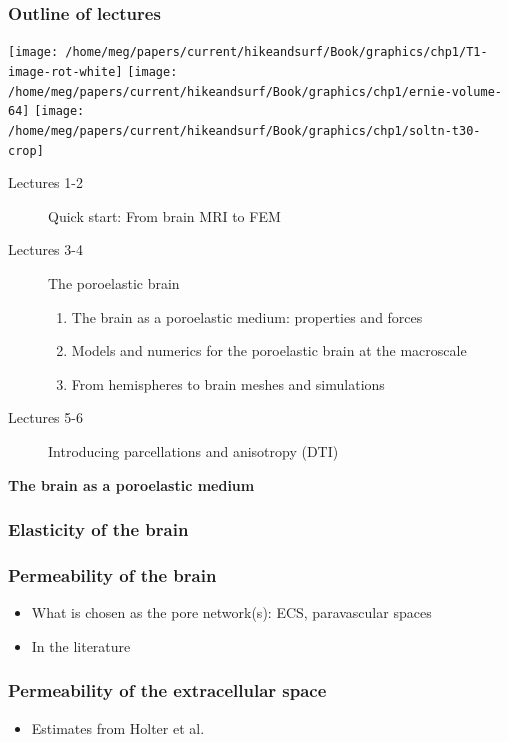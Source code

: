 \documentclass[10pt, mathserif, aspectratio=169, t]{beamer}
\newcommand{\mysection}[1]{\begin{frame} \begin{center} \vspace{3em} \textbf{#1} \end{center} \end{frame}}
\begin{document}
\begin{frame}
  \frametitle{Outline of lectures}
  \begin{center}
  \texttt{[image: /home/meg/papers/current/hikeandsurf/Book/graphics/chp1/T1-image-rot-white]}
  \texttt{[image: /home/meg/papers/current/hikeandsurf/Book/graphics/chp1/ernie-volume-64]}
  \texttt{[image: /home/meg/papers/current/hikeandsurf/Book/graphics/chp1/soltn-t30-crop]}
  \end{center}
  \begin{description}
    \item[Lectures 1-2] Quick start: From brain MRI to FEM
    \item[Lectures 3-4] The poroelastic brain  
      \begin{enumerate}[I]
      \item
        The brain as a poroelastic medium: properties and forces
      \item
        Models and numerics for the poroelastic brain at the macroscale
      \item
        From hemispheres to brain meshes and simulations
      \end{enumerate}
    \item[Lectures 5-6] Introducing parcellations and anisotropy (DTI)
  \end{description}
\end{frame}

\mysection{The brain as a poroelastic medium}





\begin{frame}
\frametitle{Elasticity of the brain}
\end{frame}

\begin{frame}
\frametitle{Permeability of the brain}

\begin{itemize}
\item
  What is chosen as the pore network(s): ECS, paravascular spaces
\item
  In the literature
\end{itemize}
\end{frame}

\begin{frame}
\frametitle{Permeability of the extracellular space}

\begin{itemize}
\item
  Estimates from Holter et al.
\end{itemize}
\end{frame}
\end{document}
